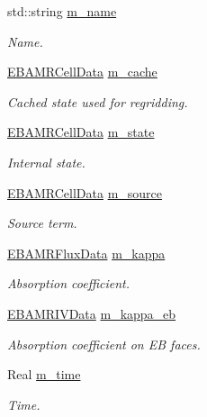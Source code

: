 \begin{DoxyCompactItemize}
std\+::string \hyperlink{classrte__solver_ae382b783ea69f9ce1a90a5bbe5b62724}{m\+\_\+name}
\begin{DoxyCompactList}\small\item\em Name. \end{DoxyCompactList}\item 
\hyperlink{type__definitions_8H_a7e610f301989e5e07781c5e338bdb7c3}{E\+B\+A\+M\+R\+Cell\+Data} \hyperlink{classrte__solver_a5502293d351adb187fc81c62413e731a}{m\+\_\+cache}
\begin{DoxyCompactList}\small\item\em Cached state used for regridding. \end{DoxyCompactList}\item 
\hyperlink{type__definitions_8H_a7e610f301989e5e07781c5e338bdb7c3}{E\+B\+A\+M\+R\+Cell\+Data} \hyperlink{classrte__solver_ae4fc24d6160537699f84c3c6a89a926e}{m\+\_\+state}
\begin{DoxyCompactList}\small\item\em Internal state. \end{DoxyCompactList}\item 
\hyperlink{type__definitions_8H_a7e610f301989e5e07781c5e338bdb7c3}{E\+B\+A\+M\+R\+Cell\+Data} \hyperlink{classrte__solver_a377bc1e257c98a965b5faf951ae79f09}{m\+\_\+source}
\begin{DoxyCompactList}\small\item\em Source term. \end{DoxyCompactList}\item 
\hyperlink{type__definitions_8H_aadad278b2e5d3d4abcf9032f90ba78c3}{E\+B\+A\+M\+R\+Flux\+Data} \hyperlink{classrte__solver_ae5cfc01b0a14fe67e896cbeddb172771}{m\+\_\+kappa}
\begin{DoxyCompactList}\small\item\em Absorption coefficient. \end{DoxyCompactList}\item 
\hyperlink{type__definitions_8H_a6b8fa905d55cbb491b52180386f0e0c1}{E\+B\+A\+M\+R\+I\+V\+Data} \hyperlink{classrte__solver_ab0c0eea8bb4b68fced66198a4535a199}{m\+\_\+kappa\+\_\+eb}
\begin{DoxyCompactList}\small\item\em Absorption coefficient on EB faces. \end{DoxyCompactList}\item 
Real \hyperlink{classrte__solver_af312dbcc4214dbe8ab2cb341326e8730}{m\+\_\+time}
\begin{DoxyCompactList}\small\item\em Time. \end{DoxyCompactList}\item 

\end{DoxyCompactItemize}
